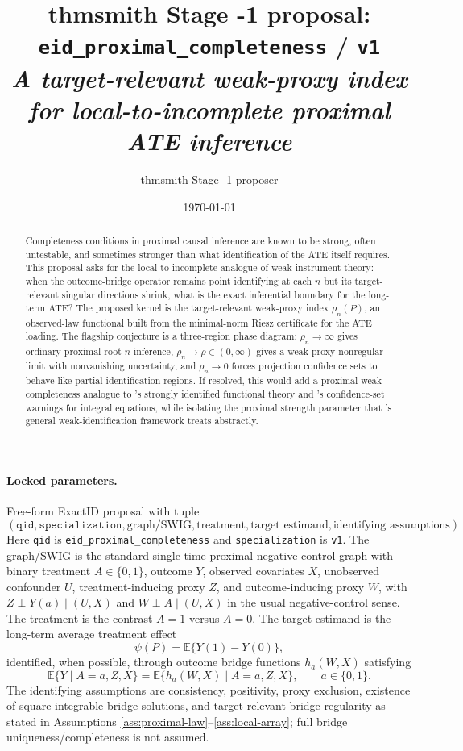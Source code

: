 \documentclass[11pt]{article}
\title{thmsmith Stage -1 proposal: \texttt{eid\_proximal\_completeness} / \texttt{v1}%
  \\ \large\textit{A target-relevant weak-proxy index for local-to-incomplete proximal ATE inference}}
\author{thmsmith Stage -1 proposer}
\date{\today}
\newcommand{\E}{\mathbb{E}}
\theoremstyle{definition}
\theoremstyle{plain}
\theoremstyle{remark}
\begin{document}
\maketitle


\paragraph{Locked parameters.}
Free-form ExactID proposal with tuple
\[
(\texttt{qid},\texttt{specialization},\text{graph/SWIG},\text{treatment},
\text{target estimand},\text{identifying assumptions}).
\]
Here \texttt{qid} is \texttt{eid\_proximal\_completeness} and
\texttt{specialization} is \texttt{v1}.  The graph/SWIG is the standard
single-time proximal negative-control graph with binary treatment
$A\in\{0,1\}$, outcome $Y$, observed covariates $X$, unobserved confounder
$U$, treatment-inducing proxy $Z$, and outcome-inducing proxy $W$, with
$Z\perp Y(a)\mid(U,X)$ and $W\perp A\mid(U,X)$ in the usual negative-control
sense.  The treatment is the contrast $A=1$ versus $A=0$.  The target
estimand is the long-term average treatment effect
\[
\psi(P)=\E\{Y(1)-Y(0)\},
\]
identified, when possible, through outcome bridge functions
$h_a(W,X)$ satisfying
\[
\E\{Y\mid A=a,Z,X\}=\E\{h_a(W,X)\mid A=a,Z,X\},\qquad a\in\{0,1\}.
\]
The identifying assumptions are consistency, positivity, proxy exclusion,
existence of square-integrable bridge solutions, and target-relevant bridge
regularity as stated in Assumptions \ref{ass:proximal-law}--\ref{ass:local-array};
full bridge uniqueness/completeness is not assumed.

\begin{abstract}
Completeness conditions in proximal causal inference are known to be strong,
often untestable, and sometimes stronger than what identification of the ATE
itself requires.  This proposal asks for the local-to-incomplete analogue of
weak-instrument theory: when the outcome-bridge operator remains point
identifying at each $n$ but its target-relevant singular directions shrink,
what is the exact inferential boundary for the long-term ATE?  The proposed
kernel is the target-relevant weak-proxy index $\rho_n(P)$, an observed-law
functional built from the minimal-norm Riesz certificate for the ATE loading.
The flagship conjecture is a three-region phase diagram: $\rho_n\to\infty$
gives ordinary proximal root-$n$ inference, $\rho_n\to\rho\in(0,\infty)$ gives
a weak-proxy nonregular limit with nonvanishing uncertainty, and $\rho_n\to0$
forces projection confidence sets to behave like partial-identification
regions.  If resolved, this would add a proximal weak-completeness analogue to
\cite{BennettKallusMaoNeweySyrgkanisUehara2023}'s strongly identified
functional theory and \cite{SmuclerRobinsRotnitzky2025}'s confidence-set
warnings for integral equations, while isolating the proximal strength
parameter that \cite{AndrewsCheng2012}'s general weak-identification framework
treats abstractly.
\end{abstract}
\end{document}
